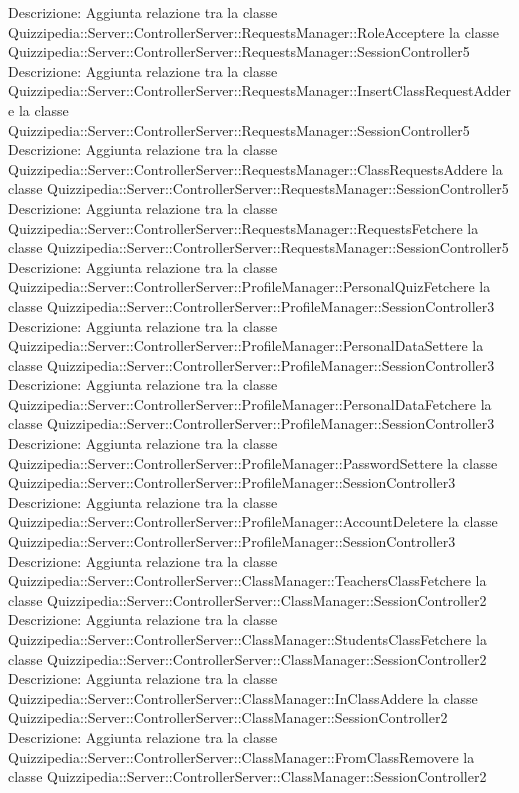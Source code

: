 Descrizione: Aggiunta relazione tra la classe Quizzipedia::Server::ControllerServer::RequestsManager::RoleAcceptere la classe Quizzipedia::Server::ControllerServer::RequestsManager::SessionController5 
Descrizione: Aggiunta relazione tra la classe Quizzipedia::Server::ControllerServer::RequestsManager::InsertClassRequestAddere la classe Quizzipedia::Server::ControllerServer::RequestsManager::SessionController5 
Descrizione: Aggiunta relazione tra la classe Quizzipedia::Server::ControllerServer::RequestsManager::ClassRequestsAddere la classe Quizzipedia::Server::ControllerServer::RequestsManager::SessionController5 
Descrizione: Aggiunta relazione tra la classe Quizzipedia::Server::ControllerServer::RequestsManager::RequestsFetchere la classe Quizzipedia::Server::ControllerServer::RequestsManager::SessionController5 
Descrizione: Aggiunta relazione tra la classe Quizzipedia::Server::ControllerServer::ProfileManager::PersonalQuizFetchere la classe Quizzipedia::Server::ControllerServer::ProfileManager::SessionController3 
Descrizione: Aggiunta relazione tra la classe Quizzipedia::Server::ControllerServer::ProfileManager::PersonalDataSettere la classe Quizzipedia::Server::ControllerServer::ProfileManager::SessionController3 
Descrizione: Aggiunta relazione tra la classe Quizzipedia::Server::ControllerServer::ProfileManager::PersonalDataFetchere la classe Quizzipedia::Server::ControllerServer::ProfileManager::SessionController3 
Descrizione: Aggiunta relazione tra la classe Quizzipedia::Server::ControllerServer::ProfileManager::PasswordSettere la classe Quizzipedia::Server::ControllerServer::ProfileManager::SessionController3 
Descrizione: Aggiunta relazione tra la classe Quizzipedia::Server::ControllerServer::ProfileManager::AccountDeletere la classe Quizzipedia::Server::ControllerServer::ProfileManager::SessionController3 
Descrizione: Aggiunta relazione tra la classe Quizzipedia::Server::ControllerServer::ClassManager::TeachersClassFetchere la classe Quizzipedia::Server::ControllerServer::ClassManager::SessionController2 
Descrizione: Aggiunta relazione tra la classe Quizzipedia::Server::ControllerServer::ClassManager::StudentsClassFetchere la classe Quizzipedia::Server::ControllerServer::ClassManager::SessionController2 
Descrizione: Aggiunta relazione tra la classe Quizzipedia::Server::ControllerServer::ClassManager::InClassAddere la classe Quizzipedia::Server::ControllerServer::ClassManager::SessionController2 
Descrizione: Aggiunta relazione tra la classe Quizzipedia::Server::ControllerServer::ClassManager::FromClassRemovere la classe Quizzipedia::Server::ControllerServer::ClassManager::SessionController2 
